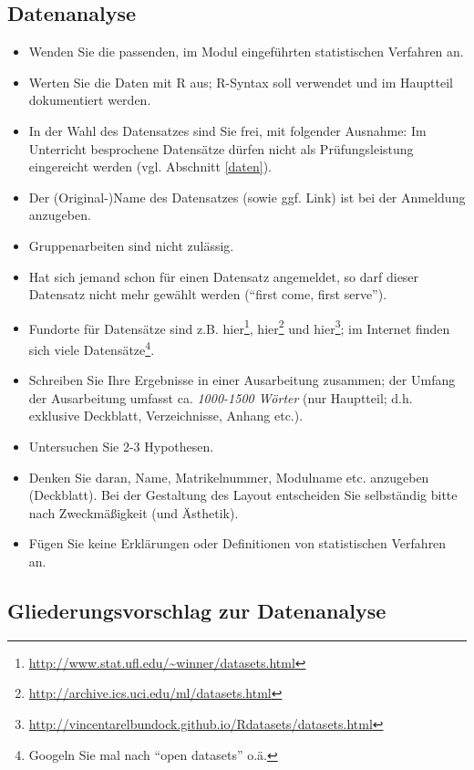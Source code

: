 \documentclass[12pt,ngerman,]{book}
\let\rmarkdownfootnote\footnote%
\def\footnote{\protect\rmarkdownfootnote}
\renewcommand{\href}[2]{#2\footnote{\url{#1}}}
\begin{document}
\subsection{Datenanalyse}\label{datenanalyse}

\begin{itemize}
\item
  Wenden Sie die passenden, im Modul eingeführten statistischen
  Verfahren an.
\item
  Werten Sie die Daten mit R aus; R-Syntax soll verwendet und im
  Hauptteil dokumentiert werden.
\item
  In der Wahl des Datensatzes sind Sie frei, mit folgender Ausnahme: Im
  Unterricht besprochene Datensätze dürfen nicht als Prüfungsleistung
  eingereicht werden (vgl. Abschnitt \ref{daten}).
\item
  Der (Original-)Name des Datensatzes (sowie ggf. Link) ist bei der
  Anmeldung anzugeben.
\item
  Gruppenarbeiten sind nicht zulässig.
\item
  Hat sich jemand schon für einen Datensatz angemeldet, so darf dieser
  Datensatz nicht mehr gewählt werden (``first come, first serve'').
\item
  Fundorte für Datensätze sind z.B.
  \href{http://www.stat.ufl.edu/~winner/datasets.html}{hier},
  \href{http://archive.ics.uci.edu/ml/datasets.html}{hier} und
  \href{http://vincentarelbundock.github.io/Rdatasets/datasets.html}{hier};
  im Internet finden sich viele Datensätze\footnote{Googeln Sie mal nach
    ``open datasets'' o.ä.}.
\item
  Schreiben Sie Ihre Ergebnisse in einer Ausarbeitung zusammen; der
  Umfang der Ausarbeitung umfasst ca. \emph{1000-1500 Wörter} (nur
  Hauptteil; d.h. exklusive Deckblatt, Verzeichnisse, Anhang etc.).
\item
  Untersuchen Sie 2-3 Hypothesen.
\item
  Denken Sie daran, Name, Matrikelnummer, Modulname etc. anzugeben
  (Deckblatt). Bei der Gestaltung des Layout entscheiden Sie selbständig
  bitte nach Zweckmäßigkeit (und Ästhetik).
\item
  Fügen Sie keine Erklärungen oder Definitionen von statistischen
  Verfahren an.
\end{itemize}

\subsection{Gliederungsvorschlag zur
Datenanalyse}\label{gliederungsvorschlag-zur-datenanalyse}
\end{document}
